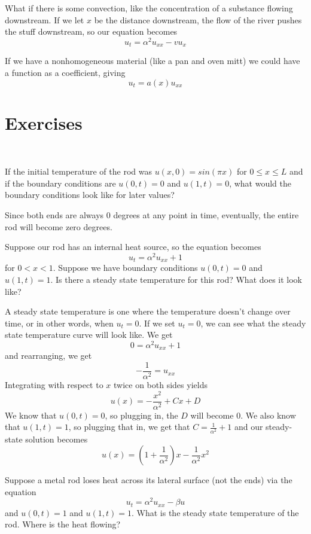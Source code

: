 \documentclass{article}
\begin{document}
What if there is some convection, like the concentration of a substance flowing downstream. If we let $x$ be the distance downstream, the flow of the river pushes the stuff downstream, so our equation becomes $$u_t = \alpha^2u_{xx} - vu_x$$

If we have a nonhomogeneous material (like a pan and oven mitt) we could have a function as a coefficient, giving $$u_t = a(x) u_{xx}$$

\section{Exercises}
\ 
\begin{exercise}
If the initial temperature of the rod was $u(x,0) = sin(\pi x)$ for $0\leq x \leq L$ and if the boundary conditions are $u(0,t) = 0$ and $u(1,t) = 0$, what would the boundary conditions look like for later values?
\end{exercise}

\begin{solution}
Since both ends are always $0$ degrees at any point in time, eventually, the entire rod will become zero degrees. 
\end{solution}

\begin{exercise}
Suppose our rod has an internal heat source, so the equation becomes $$u_t = \alpha^2 u_{xx} + 1$$for $0<x<1$. Suppose we have boundary conditions $u(0,t) = 0$ and $u(1,t) = 1$. Is there a steady state temperature for this rod? What does it look like?
\end{exercise}

\begin{solution}
A steady state temperature is one where the temperature doesn't change over time, or in other words, when $u_t = 0$. If we set $u_t = 0$, we can see what the steady state temperature curve will look like. We get $$0 = \alpha^2u_{xx} + 1$$and rearranging, we get $$-\frac{1}{\alpha^2} = u_{xx}$$Integrating with respect to $x$ twice on both sides yields $$u(x) = -\frac{x^2}{\alpha^2} + Cx + D$$We know that $u(0,t) = 0$, so plugging in, the $D$ will become $0$. We also know that $u(1,t) = 1$, so plugging that in, we get that $C = \frac{1}{\alpha^2} +1$ and our steady-state solution becomes $$u(x) = (1+\frac{1}{\alpha^2})x-\frac{1}{\alpha^2}x^2$$
\end{solution}


\begin{exercise}
Suppose a metal rod loses heat across its lateral surface (not the ends) via the equation $$u_t = \alpha^2u_{xx} - \beta u$$and $u(0,t) = 1$ and $u(1,t) = 1$. What is the steady state temperature of the rod. Where is the heat flowing?
\end{exercise}
\end{document}
